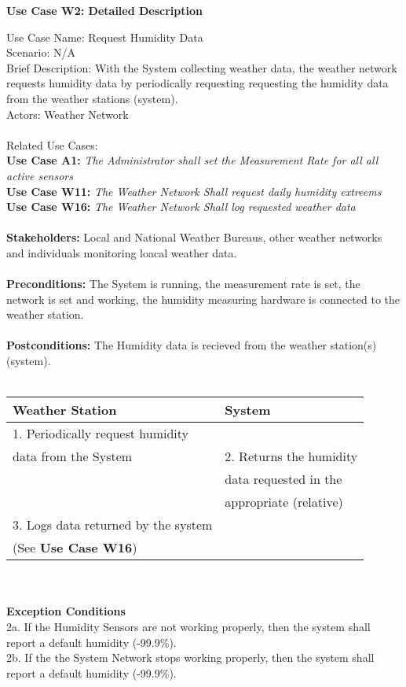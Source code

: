 \documentclass[letterpaper]{article}
\begin{document}
\noindent
\begin{center}
\textbf{Use Case W2:  Detailed Description}
\end{center}
\vspace{4ex}
Use Case Name:  Request Humidity Data\\
Scenario:  N/A\\
Brief Description:  With the System collecting weather data, the
weather network requests humidity data by periodically requesting
requesting the humidity data from the weather stations (system).\\
Actors:  Weather Network\\\\
Related Use Cases:\\
\textbf{Use Case A1:  }\textit{The Administrator shall set the
Measurement Rate for all all active sensors}\\
\textbf{Use Case W11:  }\textit{The Weather Network Shall request
daily humidity extreems}\\
\textbf{Use Case W16:  }\textit{The Weather Network Shall log
requested weather data}\\\\
\textbf{Stakeholders:  }Local and National Weather Bureaus, other
weather networks and individuals monitoring loacal weather data.\\\\
\textbf{Preconditions:  }The System is running, the measurement rate
is set, the network is set and working, the humidity measuring
hardware is connected to the weather station.\\\\
\textbf{Postconditions:  }The Humidity data is recieved from the
weather station(s) (system).\\\\
\begin{tabular}{|l|l|}\hline
\textbf{Weather Station} & \textbf{System}\\\hline
1.  Periodically request humidity & \\
data from the System & 2.  Returns the humidity\\
                     & data requested in the \\
                     & appropriate (relative)\\\hline
3.  Logs data returned by the system & \\
(See \textbf{Use Case W16}) & \\\hline
\end{tabular}\\\\
\textbf{Exception Conditions}\\
2a.  If the Humidity Sensors are not working properly, then the
system shall report a default humidity (-99.9\%).\\
2b.  If the the System Network stops working properly, then the
system shall report a default humidity (-99.9\%).
\end{document}
